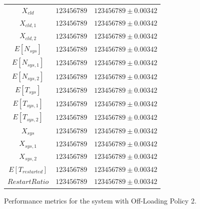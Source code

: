 \begin{figure}
\begin{center}
\begin{tabular}{|c||c|c|}
			$X_{cld}$  & $123456789$ & $123456789\pm 0.00342$ \\
			$X_{cld,1}$  & $123456789$ & $123456789\pm 0.00342$ \\
			$X_{cld,2}$  & $123456789$ & $123456789\pm 0.00342$ \\
			\hline
			$E[N_{sys}]$  & $123456789$ & $123456789\pm 0.00342$ \\
			$E[N_{sys,1}]$  & $123456789$ & $123456789\pm 0.00342$ \\
			$E[N_{sys,2}]$  & $123456789$ & $123456789\pm 0.00342$ \\
			$E[T_{sys}]$  & $123456789$ & $123456789\pm 0.00342$ \\
			$E[T_{sys,1}]$  & $123456789$ & $123456789\pm 0.00342$ \\
			$E[T_{sys,2}]$  & $123456789$ & $123456789\pm 0.00342$ \\
			$X_{sys}$  & $123456789$ & $123456789\pm 0.00342$ \\
			$X_{sys,1}$  & $123456789$ & $123456789\pm 0.00342$ \\
			$X_{sys,2}$  & $123456789$ & $123456789\pm 0.00342$ \\
			\hline
			$E[T_{restarted}]$  & $123456789$ & $123456789\pm 0.00342$ \\
			$RestartRatio$  & $123456789$ & $123456789\pm 0.00342$ \\			
			\hline
		\end{tabular}
	\end{center}
	\caption{Performance metrics for the system with Off-Loading Policy 2.}
	\label{tbl:evaluation-performance-metrics-2}
\end{figure}


%

